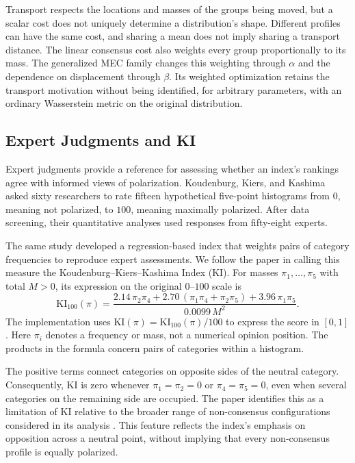 \documentclass{article}
\theoremstyle{plain}
\theoremstyle{remark}
\begin{document}
Transport respects the locations and masses of the groups being moved, but a scalar cost does not uniquely determine a distribution's shape. Different profiles can have the same cost, and sharing a mean does not imply sharing a transport distance. The linear consensus cost also weights every group proportionally to its mass. The generalized MEC family changes this weighting through $\alpha$ and the dependence on displacement through $\beta$. Its weighted optimization retains the transport motivation without being identified, for arbitrary parameters, with an ordinary Wasserstein metric on the original distribution.

\subsection{Expert Judgments and KI}\label{subsec:lit-experts}

Expert judgments provide a reference for assessing whether an index's rankings agree with informed views of polarization. Koudenburg, Kiers, and Kashima \citep{koudenburg2021new} asked sixty researchers to rate fifteen hypothetical five-point histograms from $0$, meaning not polarized, to $100$, meaning maximally polarized. After data screening, their quantitative analyses used responses from fifty-eight experts.

The same study developed a regression-based index that weights pairs of category frequencies to reproduce expert assessments. We follow the paper in calling this measure the Koudenburg--Kiers--Kashima Index (KI). For masses $\pi_1,\ldots,\pi_5$ with total $M>0$, its expression on the original $0$--$100$ scale is
\begin{equation}\label{eq:lit-ki}
\mathrm{KI}_{100}(\pi)
=\frac{2.14\,\pi_2\pi_4
       +2.70\,(\pi_1\pi_4+\pi_2\pi_5)
       +3.96\,\pi_1\pi_5}{0.0099\,M^2}.
\end{equation}
The implementation uses $\mathrm{KI}(\pi)=\mathrm{KI}_{100}(\pi)/100$ to express the score in $[0,1]$. Here $\pi_i$ denotes a frequency or mass, not a numerical opinion position. The products in the formula concern pairs of categories within a histogram.

The positive terms connect categories on opposite sides of the neutral category. Consequently, KI is zero whenever $\pi_1=\pi_2=0$ or $\pi_4=\pi_5=0$, even when several categories on the remaining side are occupied. The paper identifies this as a limitation of KI relative to the broader range of non-consensus configurations considered in its analysis \citep{aranda2026mec}. This feature reflects the index's emphasis on opposition across a neutral point, without implying that every non-consensus profile is equally polarized.
\end{document}
